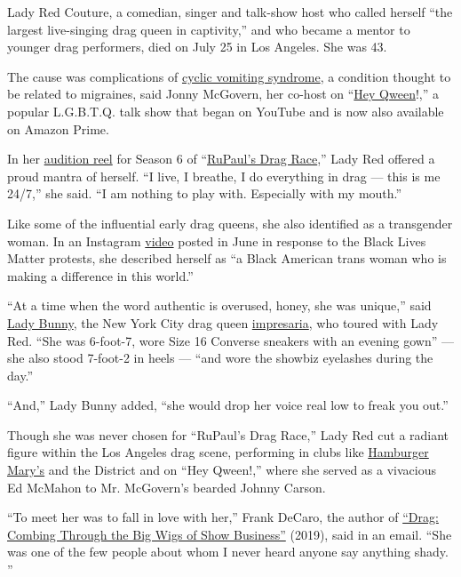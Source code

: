 Lady Red Couture, a comedian, singer and talk-show host who called
herself ``the largest live-singing drag queen in captivity,'' and who
became a mentor to younger drag performers, died on July 25 in Los
Angeles. She was 43.

The cause was complications of
\href{https://ghr.nlm.nih.gov/condition/cyclic-vomiting-syndrome\#inheritance}{cyclic
vomiting syndrome}, a condition thought to be related to migraines, said
Jonny McGovern, her co-host on
``\href{https://www.youtube.com/channel/UCStjBZ-91yduQVNtsBkjgJQ}{Hey
Qween}!,'' a popular L.G.B.T.Q. talk show that began on YouTube and is
now also available on Amazon Prime.

In her \href{https://www.youtube.com/watch?v=9R825RVrB78}{audition reel}
for Season 6 of
``\href{https://www.nytimes.com/2011/08/07/fashion/at-lunch-with-rupaul-main-course.html?searchResultPosition=11}{RuPaul's
Drag Race},'' Lady Red offered a proud mantra of herself. ``I live, I
breathe, I do everything in drag --- this is me 24/7,'' she said. ``I am
nothing to play with. Especially with my mouth.''

Like some of the influential early drag queens, she also identified as a
transgender woman. In an Instagram
\href{https://www.instagram.com/p/CBO43e4go6R/}{video} posted in June in
response to the Black Lives Matter protests, she described herself as
``a Black American trans woman who is making a difference in this
world.''

``At a time when the word authentic is overused, honey, she was
unique,'' said \href{http://ladybunny.net/}{Lady Bunny}, the New York
City drag queen
\href{https://www.nytimes.com/2018/09/29/style/lady-bunny-drag-queen.html?searchResultPosition=1}{impresaria},
who toured with Lady Red. ``She was 6-foot-7, wore Size 16 Converse
sneakers with an evening gown'' --- she also stood 7-foot-2 in heels ---
``and wore the showbiz eyelashes during the day.''

``And,'' Lady Bunny added, ``she would drop her voice real low to freak
you out.''

Though she was never chosen for ``RuPaul's Drag Race,'' Lady Red cut a
radiant figure within the Los Angeles drag scene, performing in clubs
like \href{https://www.hamburgermarys.com/weho/}{Hamburger Mary's} and
the District and on ``Hey Qween!,'' where she served as a vivacious Ed
McMahon to Mr. McGovern's bearded Johnny Carson.

``To meet her was to fall in love with her,'' Frank DeCaro, the author
of
\href{https://www.hollywoodreporter.com/news/frank-decaro-unravels-drags-origins-new-book-1208975}{``Drag:
Combing Through the Big Wigs of Show Business''} (2019), said in an
email. ``She was one of the few people about whom I never heard anyone
say anything shady. ''

